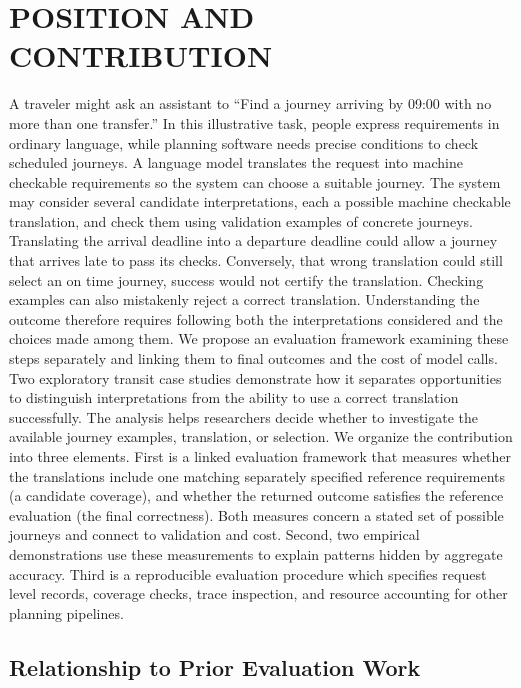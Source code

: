 \documentclass[a4paper,twoside]{article}
\begin{document}
\section{\uppercase{Position and Contribution}}
\label{sec:position}
\noindent A traveler might ask an assistant to ``Find a journey arriving by 09:00 with no more than one transfer.'' In this illustrative task, people express requirements in ordinary language, while planning software needs precise conditions to check scheduled journeys. A language model translates the request into machine checkable requirements so the system can choose a suitable journey.
The system may consider several candidate interpretations, each a possible machine checkable translation, and check them using validation examples of concrete journeys. Translating the arrival deadline into a departure deadline could allow a journey that arrives late to pass its checks. Conversely, that wrong translation could still select an on time journey, success would not certify the translation. Checking examples can also mistakenly reject a correct translation. Understanding the outcome therefore requires following both the interpretations considered and the choices made among them.
We propose an evaluation framework examining these steps separately and linking them to final outcomes and the cost of model calls. Two exploratory transit case studies demonstrate how it separates opportunities to distinguish interpretations from the ability to use a correct translation successfully. The analysis helps researchers decide whether to investigate the available journey examples, translation, or selection. We organize the contribution into three elements.
First is a linked evaluation framework that measures whether the translations include one matching separately specified reference requirements (a candidate coverage), and whether the returned outcome satisfies the reference evaluation (the final correctness). Both measures concern a stated set of possible journeys and connect to validation and cost.
Second, two empirical demonstrations use these measurements to explain patterns hidden by aggregate accuracy.
Third is a reproducible evaluation procedure which specifies request level records, coverage checks, trace inspection, and resource accounting for other planning pipelines.


\subsection{Relationship to Prior Evaluation Work}
\end{document}
